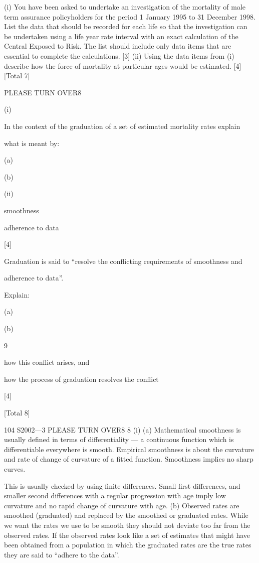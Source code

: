 \documentclass[a4paper,12pt]{article}
\begin{document}
(i) You have been asked to undertake an investigation of the mortality of male
term assurance policyholders for the period 1 January 1995 to 31 December
1998. List the data that should be recorded for each life so that the
investigation can be undertaken using a life year rate interval with an exact
calculation of the Central Exposed to Risk. The list should include only data
items that are essential to complete the calculations.
[3]
(ii) Using the data items from (i) describe how the force of mortality at particular
ages would be estimated.
[4]
[Total 7]



PLEASE TURN OVER8

(i)

In the context of the graduation of a set of estimated mortality rates explain

what is meant by:

(a)

(b)

(ii)

smoothness

adherence to data

[4]

Graduation is said to “resolve the conflicting requirements of smoothness and

adherence to data”.

Explain:

(a)

(b)

9

how this conflict arises, and

how the process of graduation resolves the conflict

[4]

[Total 8]

104 S2002—3
PLEASE TURN OVER8
8
(i)
(a)
Mathematical smoothness is usually defined in terms of differentiality — a continuous function which is differentiable everywhere is smooth.
Empirical smoothness is about the curvature and rate of change of curvature of a fitted function.
Smoothness implies no sharp curves.

This is usually checked by using finite differences.
Small first differences, and smaller second differences with a regular progression with age imply low curvature and no rapid change of
curvature with age.
(b)
Observed rates are smoothed (graduated) and replaced by the smoothed or graduated rates.
While we want the rates we use to be smooth they should not deviate too far from the observed rates.
If the observed rates look like a set of estimates that might have been obtained from a population in which the graduated rates are the true
rates they are said to “adhere to the data”.
\end{document}
